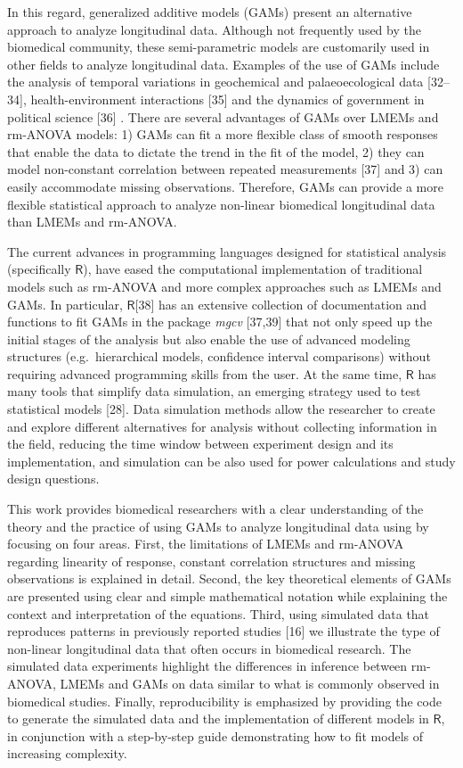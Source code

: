 \documentclass[
]{article}
\begin{document}
In this regard, generalized additive models (GAMs) present an alternative approach to analyze longitudinal data. Although not frequently used by the biomedical community, these semi-parametric models are customarily used in other fields to analyze longitudinal data. Examples of the use of GAMs include the analysis of temporal variations in geochemical and palaeoecological data {[}32--34{]}, health-environment interactions {[}35{]} and the dynamics of government in political science {[}36{]} . There are several advantages of GAMs over LMEMs and rm-ANOVA models: 1) GAMs can fit a more flexible class of smooth responses that enable the data to dictate the trend in the fit of the model, 2) they can model non-constant correlation between repeated measurements {[}37{]} and 3) can easily accommodate missing observations. Therefore, GAMs can provide a more flexible statistical approach to analyze non-linear biomedical longitudinal data than LMEMs and rm-ANOVA.

The current advances in programming languages designed for statistical analysis (specifically \(\textsf{R}\)), have eased the computational implementation of traditional models such as rm-ANOVA and more complex approaches such as LMEMs and GAMs. In particular, \(\textsf{R}\){[}38{]} has an extensive collection of documentation and functions to fit GAMs in the package \emph{mgcv} {[}37,39{]} that not only speed up the initial stages of the analysis but also enable the use of advanced modeling structures (e.g.~hierarchical models, confidence interval comparisons) without requiring advanced programming skills from the user. At the same time, \(\textsf{R}\) has many tools that simplify data simulation, an emerging strategy used to test statistical models {[}28{]}. Data simulation methods allow the researcher to create and explore different alternatives for analysis without collecting information in the field, reducing the time window between experiment design and its implementation, and simulation can be also used for power calculations and study design questions.

This work provides biomedical researchers with a clear understanding of the theory and the practice of using GAMs to analyze longitudinal data using by focusing on four areas. First, the limitations of LMEMs and rm-ANOVA regarding linearity of response, constant correlation structures and missing observations is explained in detail. Second, the key theoretical elements of GAMs are presented using clear and simple mathematical notation while explaining the context and interpretation of the equations. Third, using simulated data that reproduces patterns in previously reported studies {[}16{]} we illustrate the type of non-linear longitudinal data that often occurs in biomedical research. The simulated data experiments highlight the differences in inference between rm-ANOVA, LMEMs and GAMs on data similar to what is commonly observed in biomedical studies. Finally, reproducibility is emphasized by providing the code to generate the simulated data and the implementation of different models in \(\textsf{R}\), in conjunction with a step-by-step guide demonstrating how to fit models of increasing complexity.
\end{document}
